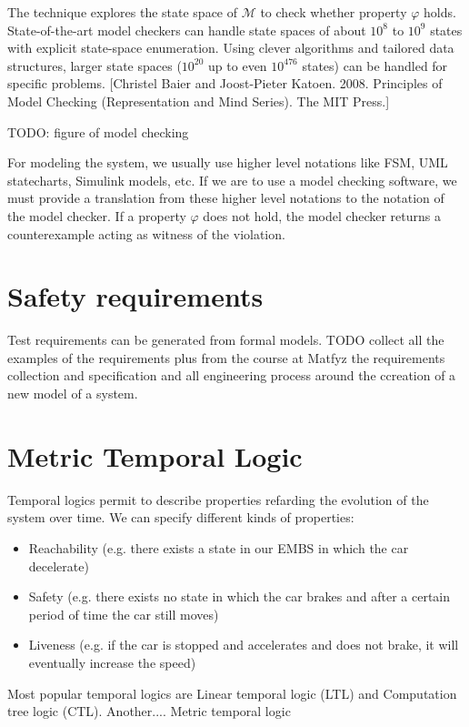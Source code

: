 The technique explores the state space of $\mathcal{M}$ to check whether property $\varphi$ holds. State-of-the-art model checkers can handle state spaces of about $10^8$ to $10^9$ states with explicit state-space enumeration. Using clever algorithms and tailored data structures, larger state spaces ($10^20$ up to even $10^476$ states) can be handled for specific problems. [Christel Baier and Joost-Pieter Katoen. 2008. Principles of Model Checking (Representation and Mind Series). The MIT Press.]

TODO: figure of model checking

For modeling the system, we usually use higher level notations like FSM, UML statecharts, Simulink models, etc. If we are to use a model checking software, we must provide a translation from these higher level notations to the notation of the model checker. If a property $\varphi$ does not hold, the model checker returns a counterexample acting as witness of the violation.

\section{Safety requirements}

Test requirements can be generated from formal models. TODO collect all the examples of the requirements plus from the course at Matfyz the requirements collection and specification and all engineering process around the ccreation of a new model of a system.

\section{Metric Temporal Logic}

Temporal logics permit to describe properties refarding the evolution of the system over time. We can specify different kinds of properties:

\begin{itemize}
	\item Reachability (e.g. there exists a state in our EMBS in which the car decelerate)
	\item Safety (e.g. there exists no state in which the car brakes and after a certain period of time the car still moves)
	\item Liveness (e.g. if the car is stopped and accelerates and does not brake, it will eventually increase the speed)
\end{itemize}

Most popular temporal logics are Linear temporal logic (LTL) and Computation tree logic (CTL). Another....  Metric temporal logic

